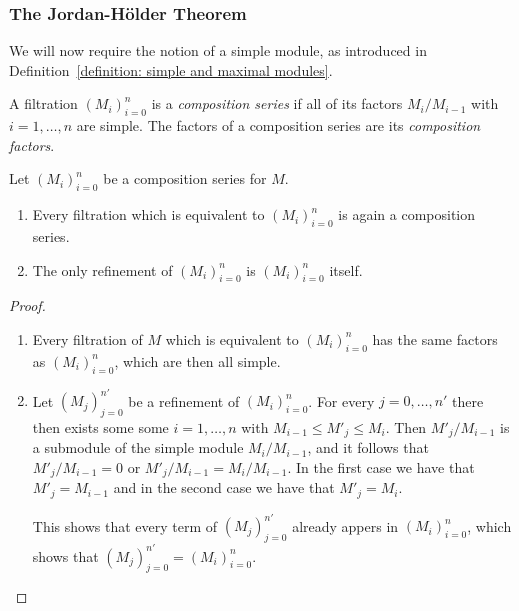 \subsubsection{The Jordan-Hölder Theorem}


\begin{fluff}
  We will now require the notion of a simple module, as introduced in Definition~\ref{definition: simple and maximal modules}.
\end{fluff}


\begin{definition}
  A filtration $(M_i)_{i=0}^n$ is a \emph{composition series} if all of its factors $M_i/M_{i-1}$ with $i = 1, \dotsc, n$ are simple.
  The factors of a composition series are its \emph{composition factors}.
\end{definition}


\begin{lemma}
  \label{lemma: preparation for Jordan Hoelder}
  Let $(M_i)_{i=0}^n$ be a composition series for $M$.
  \begin{enumerate}
    \item
      Every filtration which is equivalent to $(M_i)_{i=0}^n$ is again a composition series.
    \item
      The only refinement of $(M_i)_{i=0}^n$ is $(M_i)_{i=0}^n$ itself.
  \end{enumerate}
\end{lemma}


\begin{proof}
  \leavevmode
  \begin{enumerate}
    \item
      Every filtration of $M$ which is equivalent to $(M_i)_{i=0}^n$ has the same factors as $(M_i)_{i=0}^n$, which are then all simple.
    \item
      Let $(M_j)_{j=0}^{n'}$ be a refinement of $(M_i)_{i=0}^n$.
      For every $j = 0, \dotsc, n'$ there then exists some some $i = 1, \dotsc, n$ with $M_{i-1} \leq M'_j \leq M_i$.
      Then $M'_j/M_{i-1}$ is a submodule of the simple module $M_i/M_{i-1}$, and it follows that $M'_j/M_{i-1} = 0$ or $M'_j/M_{i-1} = M_i/M_{i-1}$.
      In the first case we have that $M'_j = M_{i-1}$ and in the second case we have that $M'_j = M_i$.
      
      This shows that every term of $(M_j)_{j=0}^{n'}$ already appers in $(M_i)_{i=0}^n$, which shows that $(M_j)_{j=0}^{n'} = (M_i)_{i=0}^n$.
    \qedhere
  \end{enumerate}
\end{proof}


